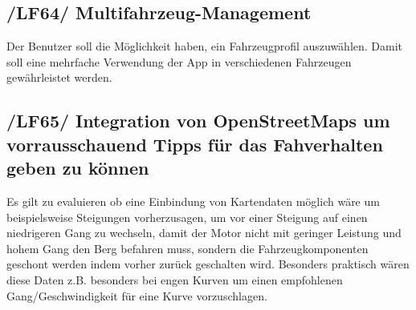 \subsection{/LF64/ Multifahrzeug-Management}
\nextline
Der Benutzer soll die Möglichkeit haben, ein Fahrzeugprofil auszuwählen. Damit soll eine mehrfache Verwendung der App in verschiedenen Fahrzeugen gewährleistet werden.

\subsection{/LF65/ Integration von OpenStreetMaps um vorrausschauend Tipps für das Fahverhalten geben zu können}
\nextline
Es gilt zu evaluieren ob eine Einbindung von Kartendaten möglich wäre um beispielsweise Steigungen vorherzusagen, um vor einer Steigung auf einen niedrigeren Gang zu wechseln, damit der Motor nicht mit geringer Leistung und hohem Gang den Berg befahren muss, sondern die Fahrzeugkomponenten geschont werden indem vorher zurück geschalten wird. Besonders praktisch wären diese Daten z.B. besonders bei engen Kurven um einen empfohlenen Gang/Geschwindigkeit für eine Kurve vorzuschlagen.
